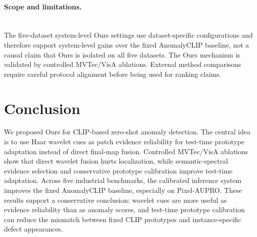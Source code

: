 \documentclass[runningheads]{llncs}
\begin{document}
\paragraph{Scope and limitations.}\mbox{}\\
\noindent
The five-dataset system-level Ours settings use dataset-specific configurations and therefore support system-level gains over the fixed AnomalyCLIP baseline, not a causal claim that Ours is isolated on all five datasets. The Ours mechanism is validated by controlled MVTec/VisA ablations. External method comparisons require careful protocol alignment before being used for ranking claims.

\section{Conclusion}

We proposed Ours for CLIP-based zero-shot anomaly detection. The central idea is to use Haar wavelet cues as patch evidence reliability for test-time prototype adaptation instead of direct final-map fusion. Controlled MVTec/VisA ablations show that direct wavelet fusion hurts localization, while semantic-spectral evidence selection and conservative prototype calibration improve test-time adaptation. Across five industrial benchmarks, the calibrated inference system improves the fixed AnomalyCLIP baseline, especially on Pixel-AUPRO. These results support a conservative conclusion: wavelet cues are more useful as evidence reliability than as anomaly scores, and test-time prototype calibration can reduce the mismatch between fixed CLIP prototypes and instance-specific defect appearances.



\end{document}
